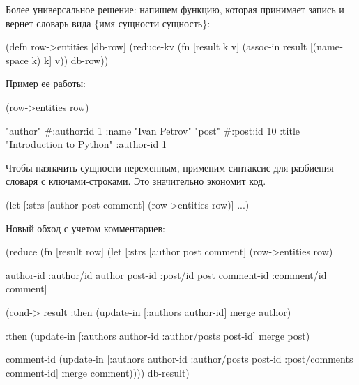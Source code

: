 Более универсальное решение: напишем функцию, которая принимает запись и вернет словарь вида \{имя сущности \arr сущность\}:

\begin{english}
  \begin{clojure}
(defn row->entities [db-row]
  (reduce-kv
   (fn [result k v]
     (assoc-in result [(namespace k) k] v))
   {}
   db-row))
  \end{clojure}
\end{english}

Пример ее работы:

\begin{english}
  \begin{clojure}
(row->entities row)

{"author" #:author{:id 1
                   :name "Ivan Petrov"}
 "post" #:post{:id 10
               :title "Introduction to Python"
               :author-id 1}}
  \end{clojure}
\end{english}

Чтобы назначить сущности переменным, применим синтаксис  для разбиения словаря с ключами-строками. Это значительно экономит код.

\begin{english}
  \begin{clojure}
(let [{:strs [author
              post
              comment]}
      (row->entities row)]
  ...)
  \end{clojure}
\end{english}

Новый обход с учетом комментариев:

\begin{english}
  \begin{clojure}
(reduce
 (fn [result row]
   (let [{:strs [author post comment]}
         (row->entities row)

         {author-id :author/id}   author
         {post-id :post/id}       post
         {comment-id :comment/id} comment]

     (cond-> result
       :then
       (update-in [:authors
                   author-id] merge author)

       :then
       (update-in [:authors
                   author-id
                   :author/posts
                   post-id] merge post)

       comment-id
       (update-in [:authors
                   author-id
                   :author/posts
                   post-id
                   :post/comments
                   comment-id] merge comment))))
 {}
 db-result)
  \end{clojure}
\end{english}

